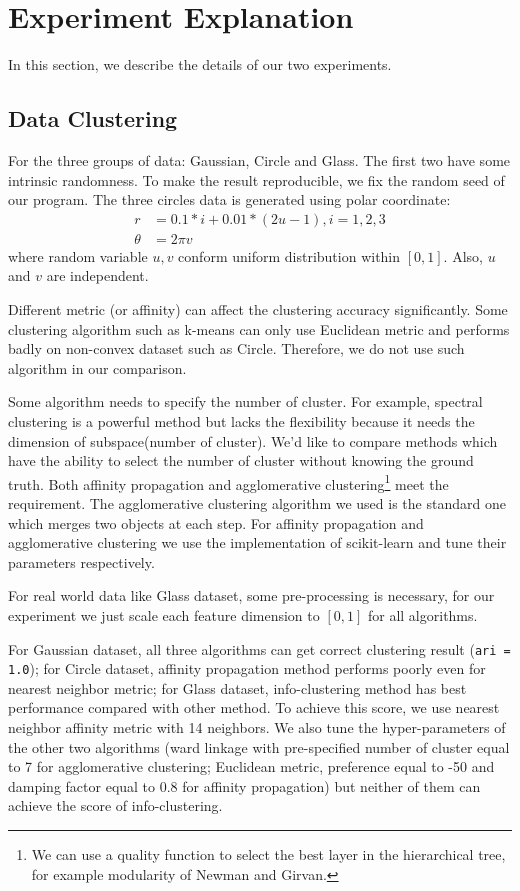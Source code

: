 \documentclass{article}
\begin{document}
\section{Experiment Explanation}
In this section, we describe the details of our two experiments. 

\subsection{Data Clustering}
For the three groups of data: \textsf{Gaussian}, \textsf{Circle} and \textsf{Glass}. The first two have some intrinsic randomness. To make the result reproducible, we fix the random seed of our program. The three circles data is generated using polar coordinate:
\begin{align*}
r &= 0.1*i + 0.01*(2u-1), i = 1, 2, 3\\
\theta & = 2\pi v
\end{align*}
where random variable $u,v$ conform uniform distribution within $[0,1]$. Also, $u$ and $v$ are independent.

Different metric (or affinity) can affect the clustering accuracy significantly. Some clustering algorithm such as \textsf{k-means} can only use Euclidean metric and performs badly on non-convex dataset such as \textsf{Circle}. Therefore, we do not use such algorithm in our comparison. 

Some algorithm needs to specify the number of cluster.  For example, spectral clustering is a powerful method but lacks the flexibility because it needs the dimension of subspace(number of cluster).  We'd like to compare methods which have the ability to select the number of cluster without knowing the ground truth. Both \textsf{affinity propagation} and \textsf{agglomerative clustering}\footnote{We can use a quality function to select the best layer in the hierarchical tree, for example modularity of Newman and Girvan.} meet the requirement. The agglomerative clustering algorithm we used is the standard one which merges two objects at each step. For \textsf{affinity propagation} and \textsf{agglomerative clustering} we use the implementation of \textsf{scikit-learn}\cite{scikit-learn} and tune their parameters respectively.

For real world data like Glass dataset, some pre-processing is necessary, for our experiment we just scale each feature dimension to $[0, 1]$ for all algorithms.

For \textsf{Gaussian} dataset, all three algorithms can get correct clustering result (\texttt{ari = 1.0}); for \textsf{Circle} dataset, affinity propagation method performs poorly even for nearest neighbor metric; for \textsf{Glass} dataset, info-clustering method has best performance compared with other method. To achieve this score, we use nearest neighbor affinity metric with 14 neighbors. We also tune the hyper-parameters of the other two algorithms (ward linkage with pre-specified number of cluster equal to 7 for agglomerative clustering; Euclidean metric, preference equal to -50 and damping factor equal to 0.8 for affinity propagation) but neither of them can achieve the score of info-clustering.
\end{document}
